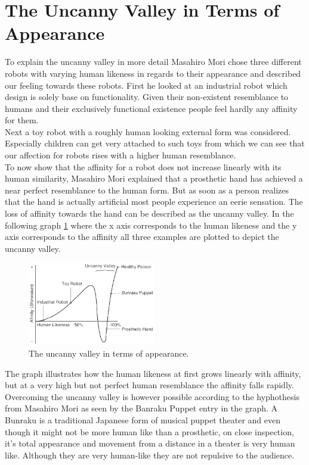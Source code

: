 \section{The Uncanny Valley in Terms of Appearance}
To explain the uncanny valley in more detail Masahiro Mori chose three different robots with varying human likeness in regards to their appearance and described our feeling towards these robots. First he looked at an industrial robot which design is solely base on functionality. Given their non-existent resemblance to humans and their exclusively functional existence people feel hardly any affinity for them.\\
Next a toy robot with a roughly human looking external form was considered. Especially children can get very attached to such toys from which we can see that our affection for robots rises with a higher human resemblance.\\
To now show that the affinity for a robot does not increase linearly with its human similarity, Masahiro Mori explained that a prosthetic hand has achieved a near perfect resemblance to the human form. But as soon as a person realizes that the hand is actually artificial most people experience an eerie sensation. The loss of affinity towards the hand can be described as the uncanny valley.
In the following graph \ref{fig:uv_appearance} where the x axis corresponds to the human likeness and the y axis corresponds to the affinity all three examples are plotted to depict the uncanny valley. 
\begin{figure} %
    \centering
    \includegraphics[width=0.5\textwidth]{graphics/uv_appearance.png}
    \caption{The uncanny valley in terms of appearance.}
    \label{fig:uv_appearance}
\end{figure}
The graph illustrates how the human likeness at first grows linearly with affinity, but at a very high but not perfect human resemblance the affinity falls rapidly.\\ Overcoming the uncanny valley is however possible according to the hyphothesis from Masahiro Mori as seen by the Banraku Puppet entry in the graph. A Bunraku is a traditional Japanese form of musical puppet theater and even though it might not be more human like than a prosthetic, on close inspection, it's total appearance and movement from a distance in a theater is very human like. Although they are very human-like they are not repulsive to the audience. \cite{6213238}

